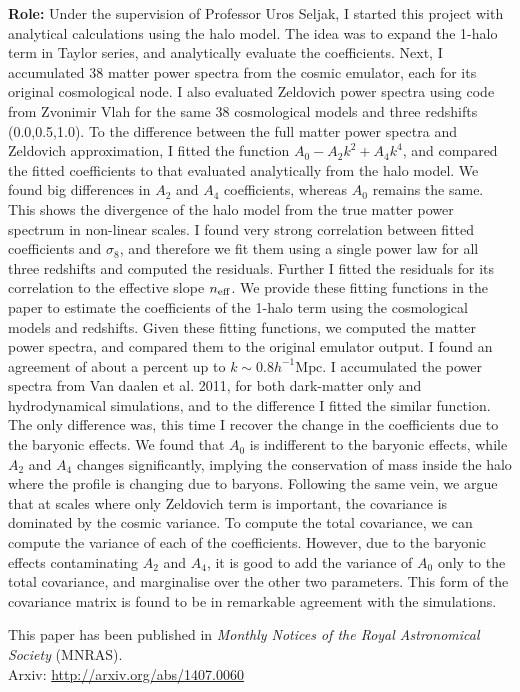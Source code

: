 {\bf Role:} Under the supervision of Professor Uros Seljak, I started
this project with analytical calculations using the halo model. The
idea was to expand the 1-halo term in Taylor series, and analytically
evaluate the coefficients. Next, I accumulated 38 matter power spectra
from the cosmic emulator, each for its original cosmological node. I
also evaluated Zeldovich power spectra using code from Zvonimir Vlah
for the same 38 cosmological models and three redshifts (0.0,0.5,1.0).
To the difference between the full matter power spectra and Zeldovich
approximation, I fitted the function $A_0 - A_2k^2 + A_4k^4$, and compared
the fitted coefficients to that evaluated analytically from the halo model. 
We found big differences in $A_2$ and $A_4$ coefficients, whereas
$A_0$ remains the same. This shows the divergence of the halo model
from the true matter power spectrum in non-linear scales. 
I found very strong correlation between fitted coefficients and $\sigma_8$,
and therefore we fit them using a single power law for all three redshifts
and computed the residuals. 
Further I fitted the residuals for its correlation to the 
effective slope $n_{\rm eff}$.
We provide these fitting functions in the paper to estimate the 
coefficients of the 1-halo term using the cosmological models
and redshifts. Given these fitting functions, we computed the matter
power spectra, and compared them to the original emulator output. 
I found an agreement of about a percent up to $k\sim 0.8 h^{-1}\mathrm{Mpc}$.
I accumulated the power spectra from Van daalen et al. 2011, for both
dark-matter only and hydrodynamical simulations, 
and to the difference I fitted the similar function. 
The only difference was, this time I 
recover the change in the coefficients due to the baryonic effects. 
We found that $A_0$ is indifferent to the baryonic effects, while
$A_2$ and $A_4$ changes significantly, implying the conservation of
mass inside the halo where the profile is changing due to baryons. 
Following the same vein, we argue that at scales where only Zeldovich
term is important, the covariance is dominated by the cosmic variance.
To compute the total covariance, we can compute the variance of 
each of the coefficients. However, due to the baryonic effects contaminating
$A_2$ and $A_4$, it is good to add the variance of $A_0$ only to the
total covariance, and marginalise over the other two parameters. 
This form of the covariance matrix is found to be in remarkable
agreement with the simulations. 

This paper has been published in {\it Monthly Notices of the Royal Astronomical
Society} (MNRAS). 
\\
Arxiv: \url{http://arxiv.org/abs/1407.0060}
\clearpage
